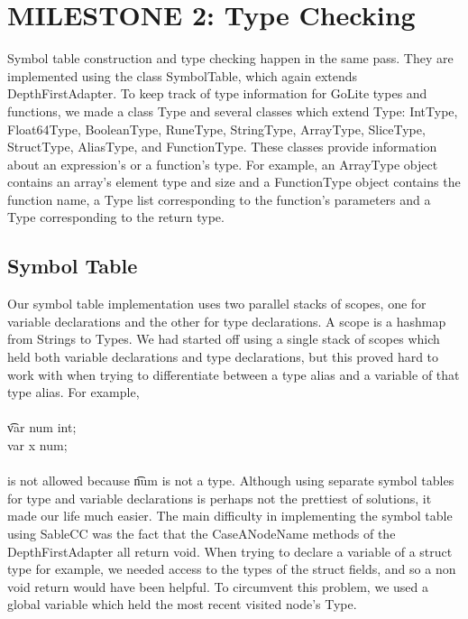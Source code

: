 \documentclass[11pt]{article}
\begin{document}
\section{MILESTONE 2: Type Checking}

Symbol table construction and type checking happen in the same pass. They are implemented using the class SymbolTable, which again extends DepthFirstAdapter. To keep track of type information for GoLite types and functions, we made a class Type and several classes which extend Type: IntType, Float64Type, BooleanType, RuneType, StringType, ArrayType, SliceType, StructType, AliasType, and FunctionType. These classes provide information about an expression's or a function's type. For example, an ArrayType object contains an array's element type and size and a FunctionType object contains the function name, a Type list corresponding to the function's parameters and a Type corresponding to the return type.

\subsection{Symbol Table}
Our symbol table implementation uses two parallel stacks of scopes, one for variable declarations and the other for type declarations. A scope is a hashmap from Strings to Types. We had started off using a single stack of scopes which held both variable declarations and type declarations, but this proved hard to work with when trying to differentiate between a type alias and a variable of that type alias. For example,\\ \ \\
\t{var num int;\\
var x num;\\ \ \\
} is not allowed because \t{num} is not a type. Although using separate symbol tables for type and variable declarations is perhaps not the prettiest of solutions, it made our life much easier. The main difficulty in implementing the symbol table using SableCC was the fact that the CaseANodeName methods of the DepthFirstAdapter
all return void. When trying to declare a variable of a struct type for example, we needed access to the types of the struct fields, and so a non void return would have been helpful. To circumvent this problem, we used a global variable which held the most recent visited node's Type.
\end{document}
